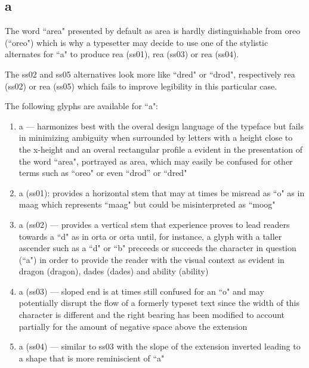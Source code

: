 \subsection{a}

The word ``area" presented by default as {\ssdefault area} is hardly
distinguishable from {\ssdefault oreo} (``oreo") which is why a typesetter may
decide to use one of the stylistic alternates for ``a" to produce
{re{\ssone a}} (ss01),
{re{\ssthree a}} (ss03) or
{re{\ssfour a}} (ss04).

The ss02 and ss05 alternatives look more like ``dred" or ``drod", respectively
{re{\sstwo a}} (ss02) or
{re{\ssfive a}} (ss05)
which fails to improve legibility in this particular case.


The following glyphs are available for ``a":
\begin{enumerate}
  \item {\ssdefault a} --- harmonizes best with the overal design language of
    the typeface but fails in minimizing ambiguity when surrounded by letters
    with a height close to the x-height and an overal rectangular profile a
    evident in the presentation of the word ``area", portrayed as
    {\ssdefault area}, which may easily be confused for other terms such as
    ``oreo" or even ``drod'' or ``dred"
  \item {\ssone a} (ss01): provides a horizontal stem that may at times be
    misread as ``o" as in {\ssdefault m{\ssone aa}g} which represents ``maag"
    but could be misinterpreted as ``moog"
  \item {\sstwo a} (ss02) --- provides a vertical stem that experience proves
    to lead readers towards a ``d" as in {orta} or
    {ort{\sstwo a}} until, for instance, a glyph with a
    taller ascender such as a ``d" or ``b" preceeds or succeeds the character
    in question (``a") in order to provide the reader with the visual context
    as evident in {\sstwo dragon} (dragon), {\sstwo dades} (dades) and
    {\sstwo ability} (ability)
  \item {\ssthree a} (ss03) --- sloped end is at times still confused for an
    ``o" and may potentially disrupt the flow of a formerly typeset text since
    the width of this character is different and the right bearing has been
    modified to account partially for the amount of negative space above the
    extension
  \item {\ssfour a} (ss04) --- similar to ss03 with the slope of the extension
    inverted leading to a shape that is more reminiscient of ``a"
\end{enumerate}
